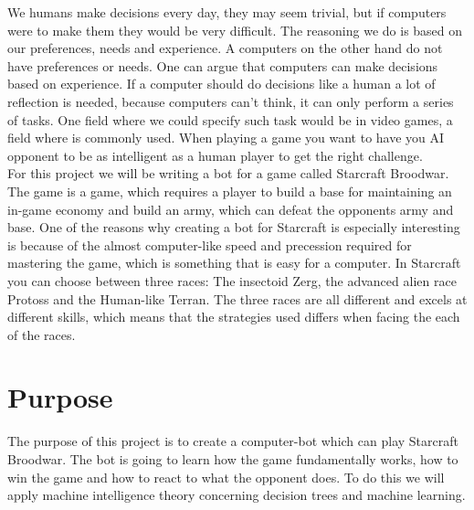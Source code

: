 	We humans make decisions every day, they may seem trivial, but if computers were to make them they would be very difficult. The reasoning we do 
	is based on our preferences, needs and experience. A computers on the other hand do not have preferences or needs. One can argue that computers can
	make decisions based on experience.
	If a computer should do decisions like a human a lot of reflection is needed, because computers can't think, it can only perform a series of tasks.
	One field where we could specify such task would be in video games, a field where \abai is commonly used. When playing 
	a game you want to have you AI opponent to be as intelligent as a human player to get the right challenge. \\
	
	For this project we will be writing a bot for a game called Starcraft Broodwar. The game is a \abrts game, which requires a player to build a base for maintaining an in-game economy and build an army, 
	which can defeat the opponents army and base. One of the reasons why creating a bot for Starcraft is 
	especially interesting is because of the almost computer-like speed and precession required for mastering the game, 
	which is something that is easy for a computer. 
	In Starcraft you can choose between three races: The insectoid Zerg, the advanced alien race Protoss and the Human-like Terran. 
	The three races are all different and excels at different skills, which means that the strategies used differs when 
	facing the each of the races. 


\section{Purpose}
	The purpose of this project is to create a computer-bot which can play Starcraft Broodwar. 
	The bot is going to learn how the game fundamentally works, 
	how to win the game and how to react to what the opponent does. 
	To do this we will apply machine intelligence theory concerning decision trees and machine learning.


